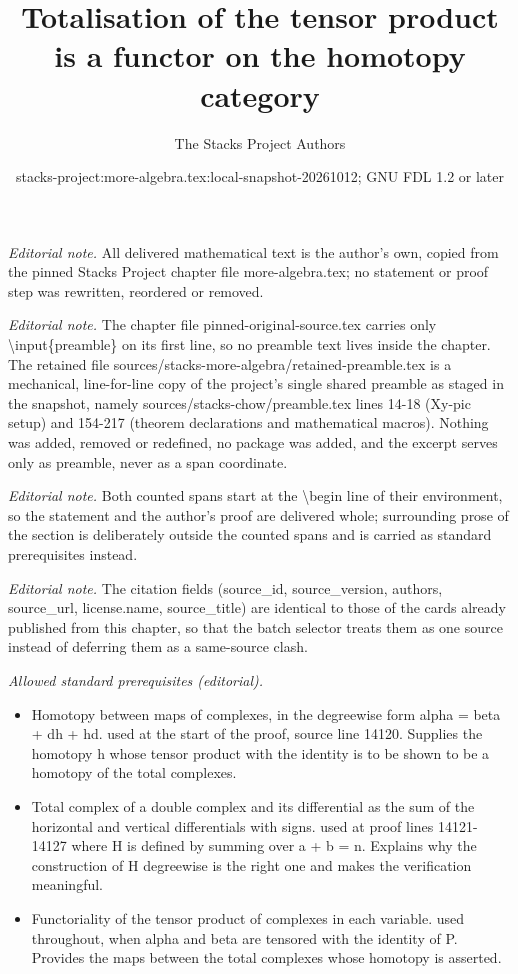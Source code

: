 \documentclass[10pt,a4paper]{amsart}
\title{Totalisation of the tensor product is a functor on the homotopy category}
\author{The Stacks Project Authors}
\date{stacks-project:more-algebra.tex:local-snapshot-20261012; GNU FDL 1.2 or later}
\theoremstyle{plain}
\theoremstyle{definition}
\theoremstyle{remark}
\numberwithin{equation}{subsection}
\begin{document}
\maketitle
\setcounter{subsection}{1}
\noindent\textit{Editorial note.} All delivered mathematical text is the author's own, copied from the pinned Stacks Project chapter file more-algebra.tex; no statement or proof step was rewritten, reordered or removed.\par\medskip
\noindent\textit{Editorial note.} The chapter file pinned-original-source.tex carries only \textbackslash{}input\{preamble\} on its first line, so no preamble text lives inside the chapter. The retained file sources/stacks-more-algebra/retained-preamble.tex is a mechanical, line-for-line copy of the project's single shared preamble as staged in the snapshot, namely sources/stacks-chow/preamble.tex lines 14-18 (Xy-pic setup) and 154-217 (theorem declarations and mathematical macros). Nothing was added, removed or redefined, no package was added, and the excerpt serves only as preamble, never as a span coordinate.\par\medskip
\noindent\textit{Editorial note.} Both counted spans start at the \textbackslash{}begin line of their environment, so the statement and the author's proof are delivered whole; surrounding prose of the section is deliberately outside the counted spans and is carried as standard prerequisites instead.\par\medskip
\noindent\textit{Editorial note.} The citation fields (source\_id, source\_version, authors, source\_url, license.name, source\_title) are identical to those of the cards already published from this chapter, so that the batch selector treats them as one source instead of deferring them as a same-source clash.\par\medskip
\noindent\textit{Allowed standard prerequisites (editorial).}\begin{itemize}
\item Homotopy between maps of complexes, in the degreewise form alpha = beta + dh + hd. used at the start of the proof, source line 14120. Supplies the homotopy h whose tensor product with the identity is to be shown to be a homotopy of the total complexes.
\item Total complex of a double complex and its differential as the sum of the horizontal and vertical differentials with signs. used at proof lines 14121-14127 where H is defined by summing over a + b = n. Explains why the construction of H degreewise is the right one and makes the verification meaningful.
\item Functoriality of the tensor product of complexes in each variable. used throughout, when alpha and beta are tensored with the identity of P. Provides the maps between the total complexes whose homotopy is asserted.
\end{itemize}\medskip
\end{document}
